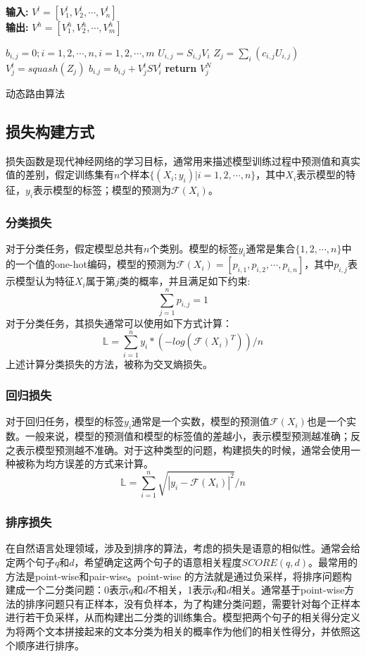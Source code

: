 \documentclass[twoside,a4paper,12pt]{book}%
\begin{document}
\begin{algorithm}[h]
    \textbf{输入:} $V^l=[V^l_1,V^l_2,\cdots, V^l_n]$\\
    \textbf{输出:} $V^h=[V^h_1,V^h_2,\cdots, V^h_m]$ 
    \begin{algorithmic}[1]
	\STATE $b_{i,j}=0; i={1,2,\cdots ,n},i={1,2,\cdots ,m}$    
        \STATE $U_{i,j}=S_{i,j}V_i$
        \STATE $Z_j=\sum_{i}(c_{i,j}U_{i,j})$
        \STATE $V_j^{t} = squash(Z_j)$ 
        \STATE $b_{i.j} = b_{i.j} + V_j^{t} S V_i^{l} $         
    \ENDFOR 
    \STATE \textbf{return} $V_j^{N}$ 
    \end{algorithmic}
    \caption{动态路由算法}
    \label{alg:dr}
\end{algorithm}

\subsection{损失构建方式}
损失函数是现代神经网络的学习目标，通常用来描述模型训练过程中预测值和真实值的差别，假定训练集有$n$个样本$\{(X_i;y_i)|i=1,2,\cdots,n\}$，其中$X_i$表示模型的特征，$y_i$表示模型的标签；模型的预测为$\mathcal{F}(X_i)$。
\subsubsection{分类损失}
对于分类任务，假定模型总共有$n$个类别。模型的标签$y_i$通常是集合$\{1,2,\cdots,n\}$中的一个值的one-hot编码，模型的预测为$\mathcal{F}(X_i)=[p_{i,1},p_{i,2},\cdots,p_{i,n}]$，其中$p_{i,j}$表示模型认为特征$X_i$属于第$j$类的概率，并且满足如下约束:
$$
\sum_{j=1}^{n}p_{i,j}=1
$$
对于分类任务，其损失通常可以使用如下方式计算：
$$
\mathbb{L}=\sum_{i=1}^{n}{y_i*(-log(\mathcal{F}(X_i)^T))}/n
$$
上述计算分类损失的方法，被称为交叉熵损失。
\subsubsection{回归损失}
对于回归任务，模型的标签$y_i$通常是一个实数，模型的预测值$\mathcal{F}(X_i)$也是一个实数。一般来说，模型的预测值和模型的标签值的差越小，表示模型预测越准确；反之表示模型预测越不准确。对于这种类型的问题，构建损失的时候，通常会使用一种被称为均方误差的方式来计算。
$$
\mathbb{L}=\sum_{i=1}^{n}{\sqrt{|y_i-\mathcal{F}(X_i)|^2}}/n
$$
\subsubsection{排序损失}
在自然语言处理领域，涉及到排序的算法，考虑的损失是语意的相似性。通常会给定两个句子$q$和$d$，希望确定这两个句子的语意相关程度$SCORE(q,d)$。最常用的方法是point-wise和pair-wise。point-wise 的方法就是通过负采样，将排序问题构建成一个二分类问题：0表示$q$和$d$不相关，1表示$q$和$d$相关。通常基于point-wise方法的排序问题只有正样本，没有负样本，为了构建分类问题，需要针对每个正样本进行若干负采样，从而构建出二分类的训练集合。模型把两个句子的相关得分定义为将两个文本拼接起来的文本分类为相关的概率作为他们的相关性得分，并依照这个顺序进行排序。
\end{document}
